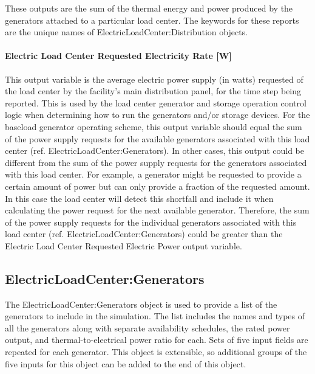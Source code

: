 These outputs are the sum of the thermal energy and power produced by the generators attached to a particular load center. The keywords for these reports are the unique names of ElectricLoadCenter:Distribution objects.

\paragraph{Electric Load Center Requested Electricity Rate {[}W{]}}\label{electric-load-center-requested-electric-power-w}

This output variable is the average electric power supply (in watts) requested of the load center by the facility's main distribution panel, for the time step being reported. This is used by the load center generator and storage operation control logic when determining how to run the generators and/or storage devices. For the baseload generator operating scheme, this output variable should equal the sum of the power supply requests for the available generators associated with this load center (ref. ElectricLoadCenter:Generators). In other cases, this output could be different from the sum of the power supply requests for the generators associated with this load center. For example, a generator might be requested to provide a certain amount of power but can only provide a fraction of the requested amount. In this case the load center will detect this shortfall and include it when calculating the power request for the next available generator. Therefore, the sum of the power supply requests for the individual generators associated with this load center (ref. ElectricLoadCenter:Generators) could be greater than the Electric Load Center Requested Electric Power output variable.

\subsection{ElectricLoadCenter:Generators}\label{electricloadcentergenerators}

The ElectricLoadCenter:Generators object is used to provide a list of the generators to include in the simulation. The list includes the names and types of all the generators along with separate availability schedules, the rated power output, and thermal-to-electrical power ratio for each. Sets of five input fields are repeated for each generator. This object is extensible, so additional groups of the five inputs for this object can be added to the end of this object.

